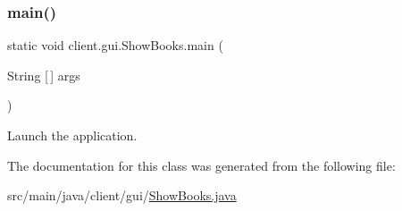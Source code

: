 \subsubsection{\texorpdfstring{main()}{main()}}
{\footnotesize\ttfamily static void client.\+gui.\+Show\+Books.\+main (\begin{DoxyParamCaption}\item[{String \mbox{[}$\,$\mbox{]}}]{args }\end{DoxyParamCaption})\hspace{0.3cm}{\ttfamily [static]}}

Launch the application. 

The documentation for this class was generated from the following file\+:\begin{DoxyCompactItemize}
\item 
src/main/java/client/gui/\hyperlink{_show_books_8java}{Show\+Books.\+java}\end{DoxyCompactItemize}
